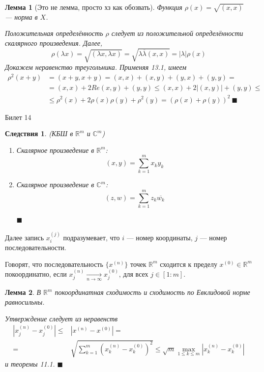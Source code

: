 \documentclass[12pt,a4paper]{article}
\newtheorem*{lemma*}{Лемма}
\newtheorem*{conseq*}{Следствия}
\begin{document}
\begin{lemma*}[Это не лемма, просто хз как обозвать]
\label{13.2}
Функция $\rho(x) = \sqrt{(x, x)}$ --- норма в $X$.

Положительная определённость $\rho$ следует из положительной определённости скалярного произведения. Далее,
$$
\rho(\lambda x) = \sqrt{(\lambda x, \lambda x)} = \sqrt{\lambda \overline{\lambda} (x, x)} = |\lambda| \rho(x)
$$
Докажем неравенство треугольника. Применяя 13.1, имеем
\begin{align*}
{\rho}^2 (x+y) &=(x+y, x+y) = (x, x) + (x, y) + (y, x) + (y, y) = \\
&=(x, x) + 2Re(x, y) + (y, y) \leq (x,x) + 2|(x, y)| + (y, y) \leq  \\
&\leq {\rho}^2 (x) + 2\rho(x)\rho(y) + {\rho}^2(y) = {(\rho(x)+\rho(y))}^2 \ \blacksquare
\end{align*}
\end{lemma*}

\begin{center}
Билет 14
\end{center}

\begin{conseq*}(КБШ в $\mathbb{R}^m$ и $\mathbb{C}^m$)
\label{14.1}
\begin{enumerate}
\item Скалярное произведение в $\mathbb{R}^m$:
$$
(x, y) = \sum\limits_{k=1}^{m} x_k y_k
$$

\item Скалярное произведение в $\mathbb{C}^m$:
$$
(z, w) = \sum\limits_{k=1}^{m} z_k \overline{w_k}
$$

$\blacksquare$
\end{enumerate}
\end{conseq*}

Далее запись $x_{i}^{(j)}$ подразумевает, что $i$ --- номер координаты, $j$ --- номер последовательности.

Говорят, что последовательность $\{ x^{(n)} \}$ точек $\mathbb{R}^m$  сходится к пределу $x^{(0)} \in \mathbb{R}^m$ покоординатно, если $x_{j}^{(n)} \xrightarrow[n\rightarrow \infty]{} x_{j}^{(0)}$, для всех $j \in [1:m]$.

\begin{lemma*}
\label{14.2}
В $\mathbb{R}^m$ покоординатная сходимость и сходимость по Евклидовой норме равносильны.

Утверждение следует из неравенств
\begin{align*}
|x_{j}^{(n)} - x_{j}^{(0)}| \leq & |x^{(n)} - x^{(0)}| = \\
= & \sqrt{\sum\limits_{k=1}^{m} {(x_{k}^{(n)} - x_{k}^{(0)})}^2} \leq \sqrt{m} \max\limits_{1\leq k \leq m} {|x_{k}^{(n)}-x_{k}^{(0)}|}
\end{align*}
и теоремы 11.1. $\blacksquare$
\end{lemma*}
\end{document}
